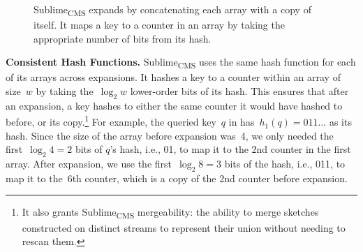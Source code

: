 \documentclass[sigconf]{acmart}
\newcommand{\sketch}{Sublime}
\newcommand{\sketchcms}{\sketch\textsubscript{CMS}\xspace}
\begin{document}
\begin{figure}
    \vspace{-1.4mm}
    \caption{\sketchcms expands by concatenating each array with a copy of
    itself. It maps a key to a counter in an array by taking the appropriate
    number of bits from its hash.}
    \label{fig:sketchbook_chain}
\end{figure}

\textbf{Consistent Hash Functions.}
\sketchcms uses the same hash function for each of its arrays across
expansions. It hashes a key to a counter within an array of size~$w$ by taking
the~$\log_2 w$ lower-order bits of its hash. This ensures that after an
expansion, a key hashes to either the same counter it would have hashed to
before, or its copy.\footnote{It also grants \sketchcms mergeability: the
ability to merge sketches constructed on distinct streams to represent their
union without needing to rescan them.} For example, the queried key~$q$ in
 has~$h_1(q)=011\dots$ as its hash. Since the size
of the array before expansion was~4, we only needed the first~$\log_2 4=2$ bits
of $q$'s hash, i.e., 01, to map it to the 2nd counter in the first array. After
expansion, we use the first~$\log_2 8=3$ bits of the hash, i.e., 011, to map it
to the~6th counter, which is a copy of the 2nd counter before expansion.
\end{document}
